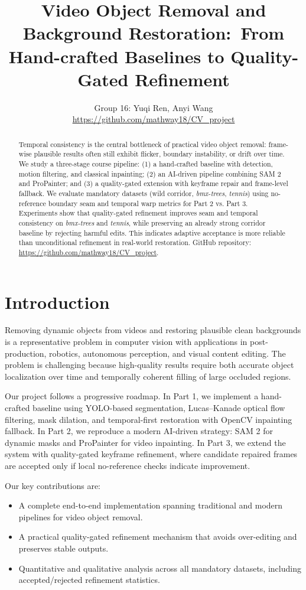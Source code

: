 \documentclass[10pt,twocolumn,letterpaper]{article}
\title{Video Object Removal and Background Restoration:\
From Hand-crafted Baselines to Quality-Gated Refinement}
\author{Group 16: Yuqi Ren, Anyi Wang\\
\url{https://github.com/mathway18/CV_project}}
\begin{document}
\maketitle

\begin{abstract}
Temporal consistency is the central bottleneck of practical video object removal: frame-wise plausible results often still exhibit flicker, boundary instability, or drift over time. We study a three-stage course pipeline: (1) a hand-crafted baseline with detection, motion filtering, and classical inpainting; (2) an AI-driven pipeline combining SAM 2 and ProPainter; and (3) a quality-gated extension with keyframe repair and frame-level fallback. We evaluate mandatory datasets (wild corridor, \textit{bmx-trees}, \textit{tennis}) using no-reference boundary seam and temporal warp metrics for Part 2 vs. Part 3. Experiments show that quality-gated refinement improves seam and temporal consistency on \textit{bmx-trees} and \textit{tennis}, while preserving an already strong corridor baseline by rejecting harmful edits. This indicates adaptive acceptance is more reliable than unconditional refinement in real-world restoration. GitHub repository: \url{https://github.com/mathway18/CV_project}.
\end{abstract}

\section{Introduction}
Removing dynamic objects from videos and restoring plausible clean backgrounds is a representative problem in computer vision with applications in post-production, robotics, autonomous perception, and visual content editing. The problem is challenging because high-quality results require both accurate object localization over time and temporally coherent filling of large occluded regions.

Our project follows a progressive roadmap. In Part 1, we implement a hand-crafted baseline using YOLO-based segmentation, Lucas--Kanade optical flow filtering, mask dilation, and temporal-first restoration with OpenCV inpainting fallback. In Part 2, we reproduce a modern AI-driven strategy: SAM 2 for dynamic masks and ProPainter for video inpainting. In Part 3, we extend the system with quality-gated keyframe refinement, where candidate repaired frames are accepted only if local no-reference checks indicate improvement.

Our key contributions are:
\begin{itemize}
    \item A complete end-to-end implementation spanning traditional and modern pipelines for video object removal.
    \item A practical quality-gated refinement mechanism that avoids over-editing and preserves stable outputs.
    \item Quantitative and qualitative analysis across all mandatory datasets, including accepted/rejected refinement statistics.
\end{itemize}
\end{document}
